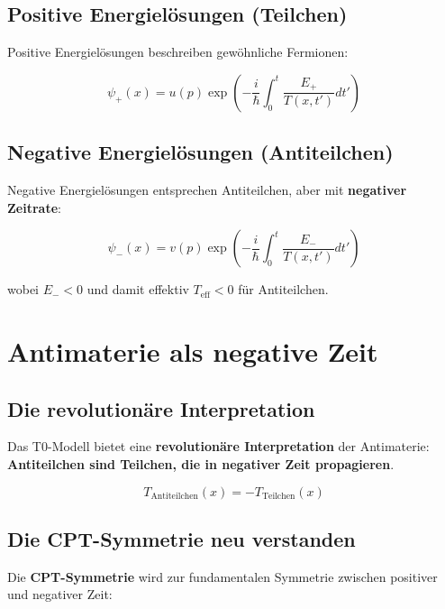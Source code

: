 \documentclass[12pt,a4paper]{report}
\begin{document}
	\subsection{Positive Energielösungen (Teilchen)}
	
	Positive Energielösungen beschreiben gewöhnliche Fermionen:
	
	\begin{equation}
		\psi_+(x) = u(p) \exp\left(-\frac{i}{\hbar}\int_0^t \frac{E_+}{T(x,t')} dt'\right)
	\end{equation}
	
	\subsection{Negative Energielösungen (Antiteilchen)}
	
	Negative Energielösungen entsprechen Antiteilchen, aber mit \textbf{negativer Zeitrate}:
	
	\begin{equation}
		\psi_-(x) = v(p) \exp\left(-\frac{i}{\hbar}\int_0^t \frac{E_-}{T(x,t')} dt'\right)
	\end{equation}
	
	wobei $E_- < 0$ und damit effektiv $T_{\text{eff}} < 0$ für Antiteilchen.
	
	\section{Antimaterie als negative Zeit}
	
	\subsection{Die revolutionäre Interpretation}
	
	Das T0-Modell bietet eine \textbf{revolutionäre Interpretation} der Antimaterie: \textbf{Antiteilchen sind Teilchen, die in negativer Zeit propagieren}.
	
	\begin{equation}
		T_{\text{Antiteilchen}}(x) = -T_{\text{Teilchen}}(x)
	\end{equation}
	
	\subsection{Die CPT-Symmetrie neu verstanden}
	
	Die \textbf{CPT-Symmetrie} wird zur fundamentalen Symmetrie zwischen positiver und negativer Zeit:
	
\end{document}
